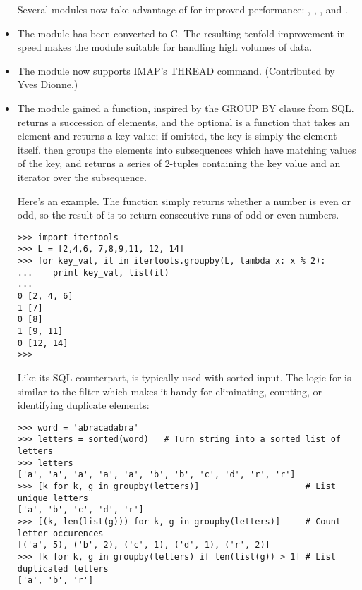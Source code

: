\documentclass{howto}
\begin{document}
\begin{itemize}
Several modules now take advantage of  for
improved performance:  , , 
, and .

\item The  module has been converted to C.  The resulting
   tenfold improvement in speed makes the module suitable for handling
   high volumes of data.

\item The  module now supports IMAP's THREAD command.
(Contributed by Yves Dionne.)

\item The  module gained a
   function,
  inspired by the GROUP BY clause from SQL.
   returns a succession of elements, and the optional
   is a function that takes an element and returns a key
  value; if omitted, the key is simply the element itself.
   then groups the elements into subsequences
  which have matching values of the key, and returns a series of 2-tuples
  containing the key value and an iterator over the subsequence.
 
Here's an example.  The  function simply returns whether a
number is even or odd, so the result of  is to
return consecutive runs of odd or even numbers.

\begin{verbatim}
>>> import itertools
>>> L = [2,4,6, 7,8,9,11, 12, 14]
>>> for key_val, it in itertools.groupby(L, lambda x: x % 2):
...    print key_val, list(it)
... 
0 [2, 4, 6]
1 [7]
0 [8]
1 [9, 11]
0 [12, 14]
>>> 
\end{verbatim}

Like its SQL counterpart,  is typically used with
sorted input.  The logic for  is similar to the
\UNIX{}  filter which makes it handy for eliminating,
counting, or identifying duplicate elements:

\begin{verbatim}
>>> word = 'abracadabra'
>>> letters = sorted(word)   # Turn string into a sorted list of letters
>>> letters 
['a', 'a', 'a', 'a', 'a', 'b', 'b', 'c', 'd', 'r', 'r']
>>> [k for k, g in groupby(letters)]                     # List unique letters
['a', 'b', 'c', 'd', 'r']
>>> [(k, len(list(g))) for k, g in groupby(letters)]     # Count letter occurences
[('a', 5), ('b', 2), ('c', 1), ('d', 1), ('r', 2)]
>>> [k for k, g in groupby(letters) if len(list(g)) > 1] # List duplicated letters
['a', 'b', 'r']
\end{verbatim}


\end{itemize}
\end{document}
